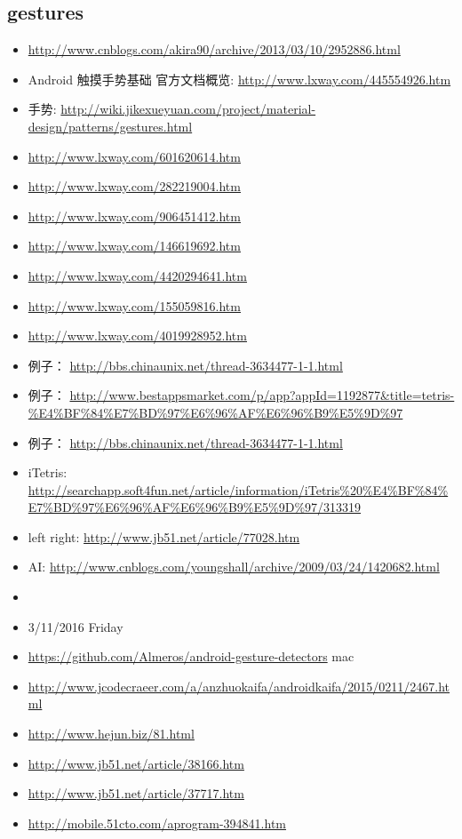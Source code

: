 \documentclass[9pt,b5paper]{article}
\begin{document}
\subsection{gestures}
\label{sec-2-6}
\begin{itemize}
\item \url{http://www.cnblogs.com/akira90/archive/2013/03/10/2952886.html}
\item Android 触摸手势基础 官方文档概览: \url{http://www.lxway.com/445554926.htm}
\item 手势: \url{http://wiki.jikexueyuan.com/project/material-design/patterns/gestures.html}
\item \url{http://www.lxway.com/601620614.htm}
\item \url{http://www.lxway.com/282219004.htm}
\item \url{http://www.lxway.com/906451412.htm}
\item \url{http://www.lxway.com/146619692.htm}
\item \url{http://www.lxway.com/4420294641.htm}
\item \url{http://www.lxway.com/155059816.htm}
\item \url{http://www.lxway.com/4019928952.htm}
\item 例子： \url{http://bbs.chinaunix.net/thread-3634477-1-1.html}
\item 例子： \url{http://www.bestappsmarket.com/p/app?appId=1192877&title=tetris-\%E4\%BF\%84\%E7\%BD\%97\%E6\%96\%AF\%E6\%96\%B9\%E5\%9D\%97}
\item 例子： \url{http://bbs.chinaunix.net/thread-3634477-1-1.html}

\item iTetris: \url{http://searchapp.soft4fun.net/article/information/iTetris\%20\%E4\%BF\%84\%E7\%BD\%97\%E6\%96\%AF\%E6\%96\%B9\%E5\%9D\%97/313319}
\item left right: \url{http://www.jb51.net/article/77028.htm}
\item AI: \url{http://www.cnblogs.com/youngshall/archive/2009/03/24/1420682.html}
\item 
\item 3/11/2016 Friday
\item \url{https://github.com/Almeros/android-gesture-detectors} mac
\item \url{http://www.jcodecraeer.com/a/anzhuokaifa/androidkaifa/2015/0211/2467.html}
\item \url{http://www.hejun.biz/81.html}
\item \url{http://www.jb51.net/article/38166.htm}
\item \url{http://www.jb51.net/article/37717.htm}
\item \url{http://mobile.51cto.com/aprogram-394841.htm}


\end{itemize}
\end{document}
